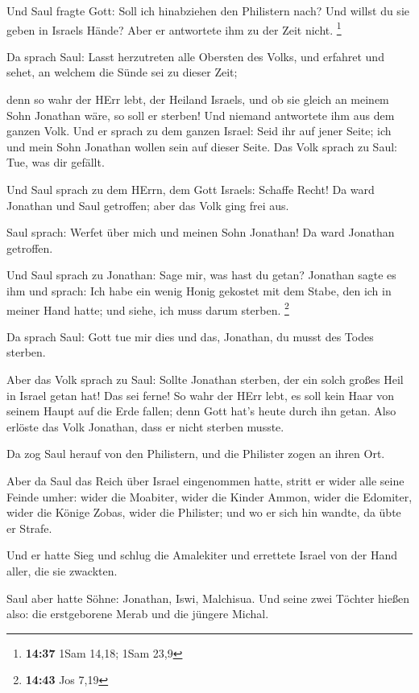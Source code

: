  Und Saul fragte Gott: Soll ich hinabziehen den Philistern
nach? Und willst du sie geben in Israels Hände? Aber er antwortete ihm
zu der Zeit nicht. \footnote{\textbf{14:37} 1Sam 14,18; 1Sam 23,9}

 Da sprach Saul: Lasst herzutreten alle Obersten des Volks,
und erfahret und sehet, an welchem die Sünde sei zu dieser Zeit;

 denn so wahr der HErr lebt, der Heiland Israels, und ob
sie gleich an meinem Sohn Jonathan wäre, so soll er sterben! Und niemand
antwortete ihm aus dem ganzen Volk.  Und er sprach zu dem
ganzen Israel: Seid ihr auf jener Seite; ich und mein Sohn Jonathan
wollen sein auf dieser Seite. Das Volk sprach zu Saul: Tue, was dir
gefällt.

 Und Saul sprach zu dem HErrn, dem Gott Israels: Schaffe
Recht! Da ward Jonathan und Saul getroffen; aber das Volk ging frei aus.

 Saul sprach: Werfet über mich und meinen Sohn Jonathan! Da
ward Jonathan getroffen.

 Und Saul sprach zu Jonathan: Sage mir, was hast du getan?
Jonathan sagte es ihm und sprach: Ich habe ein wenig Honig gekostet mit
dem Stabe, den ich in meiner Hand hatte; und siehe, ich muss darum
sterben. \footnote{\textbf{14:43} Jos 7,19}

 Da sprach Saul: Gott tue mir dies und das, Jonathan, du
musst des Todes sterben.

 Aber das Volk sprach zu Saul: Sollte Jonathan sterben, der
ein solch großes Heil in Israel getan hat! Das sei ferne! So wahr der
HErr lebt, es soll kein Haar von seinem Haupt auf die Erde fallen; denn
Gott hat's heute durch ihn getan. Also erlöste das Volk Jonathan, dass
er nicht sterben musste.

 Da zog Saul herauf von den Philistern, und die Philister
zogen an ihren Ort.

 Aber da Saul das Reich über Israel eingenommen hatte,
stritt er wider alle seine Feinde umher: wider die Moabiter, wider die
Kinder Ammon, wider die Edomiter, wider die Könige Zobas, wider die
Philister; und wo er sich hin wandte, da übte er Strafe.

 Und er hatte Sieg und schlug die Amalekiter und errettete
Israel von der Hand aller, die sie zwackten.

 Saul aber hatte Söhne: Jonathan, Iswi, Malchisua. Und
seine zwei Töchter hießen also: die erstgeborene Merab und die jüngere
Michal.

